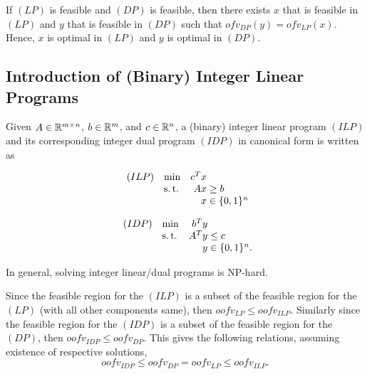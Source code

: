 \begin{thm}
    \label{thm:strong-duality-LP}
    If $(LP)$ is feasible and $(DP)$ is feasible, then there exists $x$ that is feasible in $(LP)$ and $y$ that is feasible in $(DP)$ such that $ofv_{DP}(y) = ofv_{LP}(x)$. Hence, $x$ is optimal in $(LP)$ and $y$ is optimal in $(DP)$.
\end{thm}


\subsection{Introduction of (Binary) Integer Linear Programs}
\label{subsec:introduction-of-ilps}

\begin{defn}
    \label{def:integer-linear/dual-program}
    Given $A \in \mathbb R^{m \times n}$, $b \in \mathbb R^m$, and $c \in \mathbb R^n$, a (binary) integer linear program $(ILP)$ and its corresponding integer dual program $(IDP)$ in canonical form is written as
    \begin{multicols}{2}
        \noindent
        \begin{equation*}
        \begin{array}{llr@{}l@{}l@{}}
            (ILP)   & \min  & c^T x &                   \\
                    & \st   & Ax    & {}\ge b           \\
                    &       &  x    & {}\in \{0, 1\}^n
        \end{array}
        \end{equation*}
        
        \noindent
        \begin{equation*}
        \begin{array}{llr@{}l@{}l@{}}
            (IDP)   & \min  & b^T y &                   \\
                    & \st   & A^T y & {}\le c           \\
                    &       &  y    & {}\in \{0, 1\}^n.
        \end{array}
        \end{equation*}
    \end{multicols}
\end{defn}

In general, solving integer linear/dual programs is NP-hard.

\begin{rmk}
    \label{rmk:ilp-lp-inequalities}
    Since the feasible region for the $(ILP)$ is a subset of the feasible region for the $(LP)$ (with all other components same), then $oofv_{LP} \le oofv_{ILP}$. Similarly since the feasible region for the $(IDP)$ is a subset of the feasible region for the $(DP)$, then $oofv_{IDP} \le oofv_{DP}$. This gives the following relations, assuming existence of respective solutions,
    \[
        oofv_{IDP} \le oofv_{DP} = oofv_{LP} \le oofv_{ILP}.
    \]
\end{rmk}

